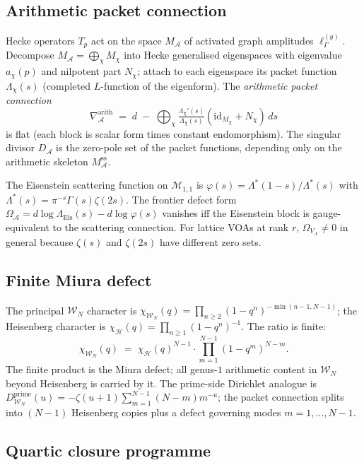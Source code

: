 \documentclass[11pt,reqno]{amsart}
\theoremstyle{definition}
\theoremstyle{remark}
\providecommand{\cA}{\mathcal{A}}
\providecommand{\cH}{\mathcal{H}}
\providecommand{\cM}{\mathcal{M}}
\providecommand{\cW}{\mathcal{W}}
\numberwithin{equation}{section}
\begin{document}
\subsection*{Arithmetic packet connection}

Hecke operators $T_p$ act on the space $M_\cA$ of activated
graph amplitudes $\ell_\Gamma^{(g)}$. Decompose
$M_\cA = \bigoplus_\chi M_\chi$ into Hecke generalised
eigenspaces with eigenvalue $a_\chi(p)$ and nilpotent part
$N_\chi$; attach to each eigenspace its packet function
$\Lambda_\chi(s)$ (completed $L$-function of the eigenform).
The \emph{arithmetic packet connection}
\[
\nabla_\cA^{\mathrm{arith}}
\;=\;
d \;-\; \bigoplus_\chi
\tfrac{\Lambda_\chi'(s)}{\Lambda_\chi(s)}
(\mathrm{id}_{M_\chi} + N_\chi)\,ds
\]
is flat (each block is scalar form times constant endomorphism).
The singular divisor $D_\cA$ is the zero-pole set of the packet
functions, depending only on the arithmetic skeleton
$M_\cA^{\mathrm{ss}}$.

The Eisenstein scattering function on $\cM_{1,1}$ is
$\varphi(s) = \Lambda^*(1-s)/\Lambda^*(s)$ with
$\Lambda^*(s) = \pi^{-s}\Gamma(s)\zeta(2s)$. The frontier
defect form
$\Omega_\cA = d\log\Lambda_{\mathrm{Eis}}(s) - d\log\varphi(s)$
vanishes iff the Eisenstein block is gauge-equivalent to the
scattering connection. For lattice VOAs at rank $r$,
$\Omega_{V_\Lambda} \neq 0$ in general because $\zeta(s)$ and
$\zeta(2s)$ have different zero sets.

\subsection*{Finite Miura defect}

The principal $\cW_N$ character is
$\chi_{\cW_N}(q) = \prod_{n \ge 2}
(1 - q^n)^{-\min(n-1, N-1)}$;
the Heisenberg character is
$\chi_\cH(q) = \prod_{n \ge 1}(1 - q^n)^{-1}$. The ratio is
finite:
\[
\chi_{\cW_N}(q)
\;=\;
\chi_\cH(q)^{N-1}
\cdot \prod_{m=1}^{N-1}(1 - q^m)^{N-m}.
\]
The finite product is the Miura defect; all genus-$1$
arithmetic content in $\cW_N$ beyond Heisenberg is carried by
it. The prime-side Dirichlet analogue is
$D_{\cW_N}^{\mathrm{prime}}(u) = -\zeta(u+1)
\sum_{m=1}^{N-1}(N - m)m^{-u}$; the packet connection splits
into $(N-1)$ Heisenberg copies plus a defect governing modes
$m = 1, \ldots, N - 1$.

\subsection*{Quartic closure programme}
\end{document}
